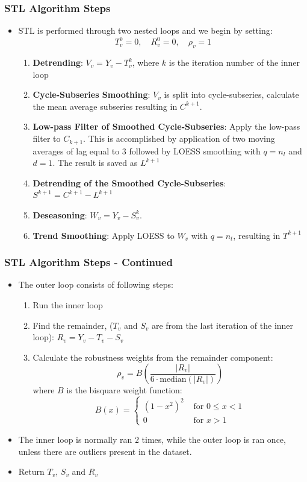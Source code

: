 \documentclass[9pt]{beamer}
\begin{document}
\begin{frame}
  \frametitle{STL Algorithm Steps}
  \begin{itemize}
  \item STL is performed through two nested loops and we begin by setting:
    \[ T_v^{0} = 0, \quad R_v^{0} = 0,  \quad \rho_v = 1 \]
\begin{enumerate}
\item \textbf{Detrending}:
  $V_v = Y_v - T_v^k$, where $k$ is the iteration number of the inner loop
\item \textbf{Cycle-Subseries Smoothing}:
  $V_v$ is split into cycle-subseries, calculate the mean average subseries
  resulting in $C^{k+1}$.
\item \textbf{Low-pass Filter of Smoothed Cycle-Subseries}:
  Apply the low-pass filter to $C_{k+1}$. This is accomplished by application of two
  moving averages of lag equal to 3 followed by LOESS smoothing with $q=n_l$
  and $d=1$. The result is saved as $L^{k+1}$
\item \textbf{Detrending of the Smoothed Cycle-Subseries}:
  $S^{k+1} = C^{k+1} - L^{k+1}$
\item \textbf{Deseasoning}:
  $W_v = Y_v - S_v^k$. 
\item \textbf{Trend Smoothing}:
  Apply LOESS to $W_v$ with $q = n_t$, resulting in $T^{k+1}$
\end{enumerate}
  \end{itemize}
\end{frame}

\begin{frame}
  \frametitle{STL Algorithm Steps - Continued}
  \begin{itemize}
\item  The outer loop consists of following steps:
  \begin{enumerate}
  \item Run the inner loop
  \item Find the remainder, ($T_v$ and $S_v$ are from the last iteration of the inner loop):
    $R_v = Y_v - T_v - S_v$
  \item Calculate the robustness weights from the remainder component:
    \[
    \rho_{v}= B\left( \frac{|R_v|}{6\cdot\text{median}(|R_v|)} \right)
    \]
    where $B$ is the bisquare weight function:
    \[
    B(x) =
    \begin{cases}
      \left(1-x^{2}\right)^{2} & \text{ for } 0 \leqslant x<1 \\
      0                     & \text{ for } x>1
    \end{cases}
    \]
\end{enumerate}
\item The inner loop is normally ran $2$ times, while the outer loop is ran
  once, unless there are outliers present in the dataset.
\item Return $T_v$, $S_v$ and $R_v$
  \end{itemize}
\end{frame}
\end{document}
